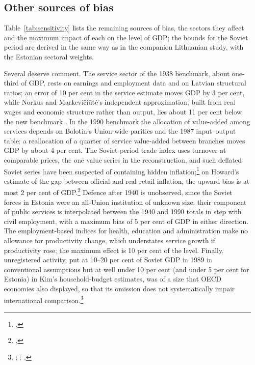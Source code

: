\subsection{Other sources of bias}

Table~\ref{tab:sensitivity} lists the remaining sources of bias, the sectors they affect and the maximum impact of each on the level of GDP; the bounds for the Soviet period are derived in the same way as in the companion Lithuanian study, with the Estonian sectoral weights.



Several deserve comment. The service sector of the 1938 benchmark, about one-third of GDP, rests on earnings and employment data and on Latvian structural ratios; an error of 10 per cent in the service estimate moves GDP by 3 per cent, while Norkus and Markevi\v{c}i\={u}t\.{e}'s independent approximation, built from real wages and economic structure rather than output, lies about 11 per cent below the new benchmark \autocite[128--30]{norkus_restorations}. In the 1990 benchmark the allocation of value-added among services depends on Bolotin's Union-wide parities and the 1987 input--output table; a reallocation of a quarter of service value-added between branches moves GDP by about 4 per cent. The Soviet-period trade index uses turnover at comparable prices, the one value series in the reconstruction, and such deflated Soviet series have been suspected of containing hidden inflation;\footnote{\autocite[688--9]{kontorovich_2001}.} on Howard's estimate of the gap between official and real retail inflation, the upward bias is at most 2 per cent of GDP.\footnote{\autocite[607]{hidden_inflation_sov}.} Defence after 1940 is unobserved, since the Soviet forces in Estonia were an all-Union institution of unknown size; their component of public services is interpolated between the 1940 and 1990 totals in step with civil employment, with a maximum bias of 5 per cent of GDP in either direction. The employment-based indices for health, education and administration make no allowance for productivity change, which understates service growth if productivity rose; the maximum effect is 10 per cent of the level. Finally, unregistered activity, put at 10--20 per cent of Soviet GDP in 1989 in conventional assumptions but at well under 10 per cent (and under 5 per cent for Estonia) in Kim's household-budget estimates, was of a size that OECD economies also displayed, so that its omission does not systematically impair international comparison.\footnote{\autocite[5]{baltictransitioncontraction}; \autocite[541, 546, 549]{kim2003}; \autocite[90--1]{shadow_europe}.}

